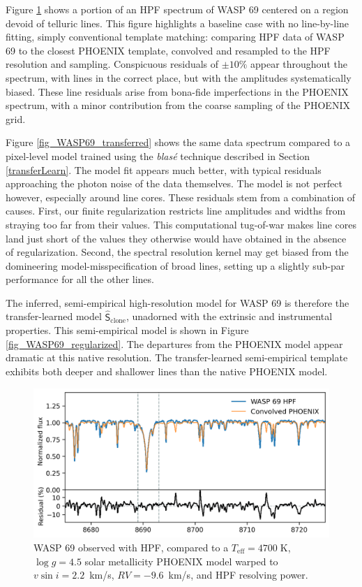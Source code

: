 \documentclass[twocolumn]{aastex631}
\begin{document}
Figure \ref{fig_WASP69_demo} shows a portion of an HPF spectrum of WASP 69 centered on a region devoid of telluric lines.  This figure highlights a baseline case with no line-by-line fitting, simply conventional template matching: comparing HPF data of WASP 69 to the closest PHOENIX template, convolved and resampled to the HPF resolution and sampling.  Conspicuous residuals of $\pm10\%$ appear throughout the spectrum, with lines in the correct place, but with the amplitudes systematically biased.  These line residuals arise from bona-fide imperfections in the PHOENIX spectrum, with a minor contribution from the coarse sampling of the PHOENIX grid.

Figure \ref{fig_WASP69_transferred} shows the same data spectrum compared to a pixel-level model trained using the \emph{blas\'e} technique described in Section \ref{transferLearn}.  The model fit appears much better, with typical residuals approaching the photon noise of the data themselves.  The model is not perfect however, especially around line cores.  These residuals stem from a combination of causes.  First, our finite regularization restricts line amplitudes and widths from straying too far from their values.  This computational tug-of-war makes line cores land just short of the values they otherwise would have obtained in the absence of regularization.  Second, the spectral resolution kernel may get biased from the domineering model-misspecification of broad lines, setting up a slightly sub-par performance for all the other lines.

The inferred, semi-empirical high-resolution model for WASP 69 is therefore the transfer-learned model $\mathsf{\hat{S}}_\mathrm{clone}$, unadorned with the extrinsic and instrumental properties.  This semi-empirical model is shown in Figure \ref{fig_WASP69_regularized}.  The departures from the PHOENIX model appear dramatic at this native resolution.  The transfer-learned semi-empirical template exhibits both deeper and shallower lines than the native PHOENIX model.


\begin{figure}[hbt!]
    \centering
    \includegraphics[width=0.98\columnwidth]{blase_WASP69_demo.png}
    \caption{WASP 69 observed with HPF, compared to a $T_{\mathrm{eff}}=4700\;$K,  $\log{g}=4.5$ solar metallicity PHOENIX model warped to $v\sin{i}=2.2$~km/s, $RV=-9.6$~km/s, and HPF resolving power.}
    \label{fig_WASP69_demo}
\end{figure}
\end{document}

